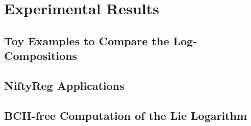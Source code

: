 
\chapter{Experimental Results}\label{ch:results}

\section{Toy Examples to Compare the Log-Compositions}

\section{NiftyReg Applications}

\section{BCH-free Computation of the Lie Logarithm }
